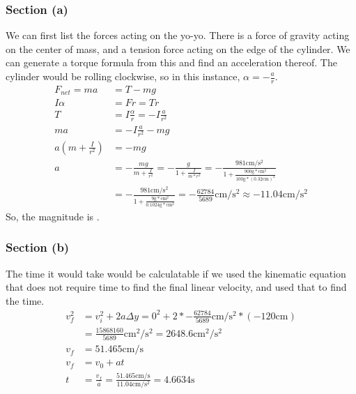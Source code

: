\documentclass[12pt]{article}
\begin{document}
\subsubsection{Section (a)}
We can first list the forces acting on the yo-yo. There is a force of gravity acting on the center of mass, and a tension force acting on the edge of the cylinder. We can generate a torque formula from this and find an acceleration thereof. The cylinder would be rolling clockwise, so in this instance, \(\alpha = -\frac{a}{r}\). 
\begin{align}
    F_{net} = ma
        &=  T - mg\\
    I\alpha &=  Fr
        =   Tr\\
    T   &=  I\frac{\alpha}{r}
        =   -I\frac{a}{r^2}\\
    ma  &=  -I\frac{a}{r^2} - mg\\
    a\left(m + \frac{I}{r^2}\right) &=  -mg\\
    a   &=  -\frac{mg}{m + \frac{I}{r^2}}
        =   -\frac{g}{1 + \frac{I}{m*r^2}}
        =   -\frac{981\unit{\centi\meter/\second^2}}{1 + \frac{900\unit{\gram*\centi\meter^2}}{100\unit{\gram}*(0.32\unit{\centi\meter})^2}}\\
        &=  -\frac{981\unit{\centi\meter/\second^2}}{1 + \frac{9\unit{\gram*\centi\meter^2}}{0.1024\unit{\gram*\centi\meter^2}}}
        =   -\frac{62784}{5689}\unit{\centi\meter/\second^2} \approx -11.04\unit{\centi\meter/\second^2}
\end{align}
So, the magnitude is .

\subsubsection{Section (b)}
The time it would take would be calculatable if we used the kinematic equation that does not require time to find the final linear velocity, and used that to find the time.
\begin{align}
    v_f^2   &=  v_i^2 + 2a\Delta y
        =   0^2 + 2*-\frac{62784}{5689}\unit{\centi\meter/\second^2}*(-120\unit{\centi\meter})\\
        &=  \frac{15868160}{5689}\unit{\centi\meter^2/\second^2}
        =   2648.6\unit{\centi\meter^2/\second^2}\\
    v_f &=  51.465\unit{\centi\meter/\second}\\
    v_f &=  v_0 + at\\
    t   &=  \frac{v_f}{a}
        =   \frac{51.465\unit{\centi\meter/\second}}{11.04\unit{\centi\meter/\second^2}}
        =   \boxed{4.6634\unit{\second}}
\end{align}
\end{document}
